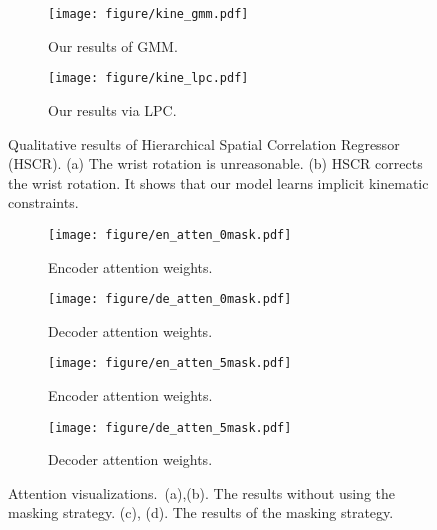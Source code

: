 \documentclass[10pt,twocolumn,letterpaper]{article}
\begin{document}
		
		\begin{figure}[!t]
			\begin{subfigure}{0.48\linewidth}
				\texttt{[image: figure/kine\_gmm.pdf]}
				\vspace{-1.5 em}
				\caption{Our results of GMM. }
				\label{fig:gmm-vis}
			\end{subfigure}
			\hfill
			\begin{subfigure}{0.48\linewidth}
				\texttt{[image: figure/kine\_lpc.pdf]}
				\vspace{-1.5 em}
				\caption{Our results via LPC. }
				\label{fig:lpc-vis}
			\end{subfigure}
			\vspace{-0.5 em}
			\caption{Qualitative results of Hierarchical Spatial Correlation Regressor (HSCR). (a) The wrist rotation is unreasonable. (b) HSCR corrects the wrist rotation. It shows that our model learns implicit kinematic constraints.}
\label{fig:hscr_kine}
		\end{figure}
		
		\begin{figure}[!t]
			\begin{subfigure}{0.48\linewidth}
				\texttt{[image: figure/en\_atten\_0mask.pdf]}
				\centering
				\vspace{-0.5 em}
				\caption{Encoder attention weights.}
				\label{fig:en_atten_0mask}
			\end{subfigure}
			\hfill
			\begin{subfigure}{0.48\linewidth}
				\texttt{[image: figure/de\_atten\_0mask.pdf]}
				\centering
				\vspace{-0.5 em}
				\caption{Decoder attention weights.}
				\label{fig:de_atten_0mask}
			\end{subfigure}
			
			\begin{subfigure}{0.48\linewidth}
				\texttt{[image: figure/en\_atten\_5mask.pdf]}
				\centering
				\vspace{-0.5 em}
				\caption{Encoder attention weights.}
				\vspace{-0.7 em}
\label{fig:en_atten_5mask}
			\end{subfigure}
			\hfill
			\begin{subfigure}{0.48\linewidth}
				\texttt{[image: figure/de\_atten\_5mask.pdf]}
				\centering
				\vspace{-0.5 em}
				\caption{Decoder attention weights.}
				\vspace{-0.7 em}
				\label{fig:de_atten_5mask}
			\end{subfigure}
			\caption{Attention visualizations.~(a),(b). The results without using the masking strategy. (c), (d). The results of the masking strategy.}
			\vspace{-1.5 em}
			\label{fig:atten}
		\end{figure}
		
\end{document}
